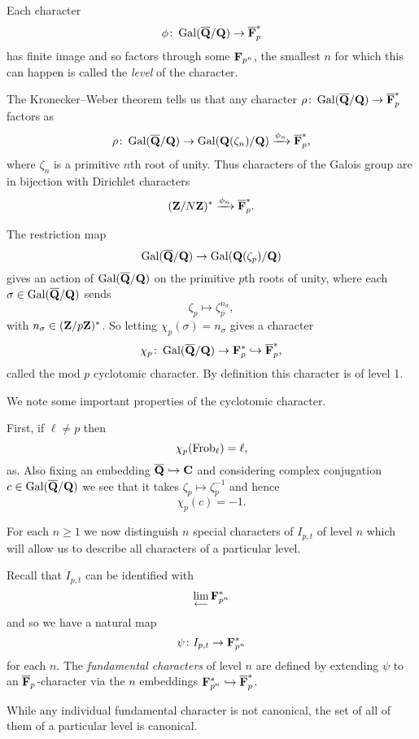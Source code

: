 \documentclass[a4paper,12pt]{article}
\begin{document}
\begin{defn}
Each character
\[
\phi \colon \operatorname{Gal}(\overline{\mathbf{Q}}/\mathbf{Q}) \to \overline{\mathbf{F}}_p^*
\]
has finite image and so factors through some $\mathbf{F}_{p^n}$, the smallest $n$ for which this can happen is called the \emph{level} of the character.
\end{defn}


The Kronecker--Weber theorem tells us that any character $\rho\colon\operatorname{Gal}(\overline{\mathbf{Q}}/\mathbf{Q}) \to \overline{\mathbf{F}}_p^*$ factors as %
\[
\rho\colon\operatorname{Gal}(\overline{\mathbf{Q}}/\mathbf{Q}) \to \operatorname{Gal}(\mathbf{Q}(\zeta_n)/\mathbf{Q})\xrightarrow{\phi_n}\overline{\mathbf{F}}_p^*,
\]
where $\zeta_n$ is a primitive $n$th root of unity.
Thus characters of the Galois group are in bijection with Dirichlet characters
\[
(\mathbf{Z}/N\mathbf{Z})^* \xrightarrow{\phi_n}\overline{\mathbf{F}}_p^*.
\]



\begin{defn}
The restriction map
\[
\operatorname{Gal}(\overline{\mathbf{Q}}/\mathbf{Q}) \to \operatorname{Gal}(\mathbf{Q}(\zeta_p)/\mathbf{Q})
\]
gives an action of $\operatorname{Gal}(\overline{\mathbf{Q}}/\mathbf{Q})$ on the primitive $p$th roots of unity, where each $\sigma\in\operatorname{Gal}(\overline{\mathbf{Q}}/\mathbf{Q})$ sends
\[
\zeta_p\mapsto \zeta_p^{n_\sigma},
\]
with $n_\sigma \in (\mathbf{Z}/p\mathbf{Z})^*$.
So letting $\chi_p(\sigma) = n_\sigma$ gives a character
\[
\chi_p\colon\operatorname{Gal}(\overline{\mathbf{Q}}/\mathbf{Q}) \to\mathbf{F}_p^*\hookrightarrow\overline{\mathbf{F}}_p^*,
\]
called the mod $p$ cyclotomic character.
By definition this character is of level 1.
\end{defn}

\begin{rmk}
We note some important properties of the cyclotomic character.

First, if $\ell \ne p$ then
\[
\chi_p(\operatorname{Frob}_\ell) = \ell,
\]
as.
Also fixing an embedding $\overline{\mathbf{Q}}\hookrightarrow\mathbf{C}$ and considering complex conjugation $c\in\operatorname{Gal}(\overline{\mathbf{Q}}/\mathbf{Q})$ we see that it takes $\zeta_p \mapsto\zeta_p^{-1}$ and hence
\[
\chi_p(c) = -1.
\]
\end{rmk}

For each $n \ge 1$ we now distinguish $n$ special characters of $I_{p,t}$ of level $n$ which will allow us to describe all characters of a particular level.

\begin{defn}\label{def:fund}
Recall that $I_{p,t}$ can be identified with
\[
\lim_{\longleftarrow} \mathbf{F}_{p^n}^*
\]
and so we have a natural map
\[
\psi\colon I_{p,t} \to \mathbf{F}_{p^n}^*
\]
for each $n$.
The \emph{fundamental characters} of level $n$ are defined by extending $\psi$ to an $\overline{\mathbf{F}}_p$-character via the $n$ embeddings $\mathbf{F}_{p^n}^* \hookrightarrow \overline{\mathbf{F}}_p^*$. %

While any individual fundamental character is not canonical, the set of all of them of a particular level is canonical. %
\end{defn}
\end{document}
